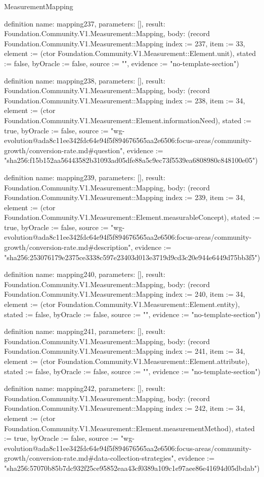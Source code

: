 \begin{lexlean}{MeasurementMapping}
\begin{semanticmodule}
definition{
  name: mapping237,
  parameters: [],
  result: Foundation.Community.V1.Measurement::Mapping,
  body: (record Foundation.Community.V1.Measurement::Mapping {index := 237, item := 33, element := (ctor Foundation.Community.V1.Measurement::Element.unit), stated := false, byOracle := false, source := "", evidence := "no-template-section"})
}

definition{
  name: mapping238,
  parameters: [],
  result: Foundation.Community.V1.Measurement::Mapping,
  body: (record Foundation.Community.V1.Measurement::Mapping {index := 238, item := 34, element := (ctor Foundation.Community.V1.Measurement::Element.informationNeed), stated := true, byOracle := false, source := "wg-evolution@ada8c11ee342fdc64e94f5f894676565aa2e6506:focus-areas/community-growth/conversion-rate.md#question", evidence := "sha256:f15b152aa56443582b31093ad05dfe88a5c9ec73f5539ea6808980c848100e05"})
}

definition{
  name: mapping239,
  parameters: [],
  result: Foundation.Community.V1.Measurement::Mapping,
  body: (record Foundation.Community.V1.Measurement::Mapping {index := 239, item := 34, element := (ctor Foundation.Community.V1.Measurement::Element.measurableConcept), stated := true, byOracle := false, source := "wg-evolution@ada8c11ee342fdc64e94f5f894676565aa2e6506:focus-areas/community-growth/conversion-rate.md#description", evidence := "sha256:253076179e2375ce3338c597e23403d013e3719d9cd3c20e944e6449d75bb3f5"})
}

definition{
  name: mapping240,
  parameters: [],
  result: Foundation.Community.V1.Measurement::Mapping,
  body: (record Foundation.Community.V1.Measurement::Mapping {index := 240, item := 34, element := (ctor Foundation.Community.V1.Measurement::Element.entity), stated := false, byOracle := false, source := "", evidence := "no-template-section"})
}

definition{
  name: mapping241,
  parameters: [],
  result: Foundation.Community.V1.Measurement::Mapping,
  body: (record Foundation.Community.V1.Measurement::Mapping {index := 241, item := 34, element := (ctor Foundation.Community.V1.Measurement::Element.attribute), stated := false, byOracle := false, source := "", evidence := "no-template-section"})
}

definition{
  name: mapping242,
  parameters: [],
  result: Foundation.Community.V1.Measurement::Mapping,
  body: (record Foundation.Community.V1.Measurement::Mapping {index := 242, item := 34, element := (ctor Foundation.Community.V1.Measurement::Element.measurementMethod), stated := true, byOracle := false, source := "wg-evolution@ada8c11ee342fdc64e94f5f894676565aa2e6506:focus-areas/community-growth/conversion-rate.md#data-collection-strategies", evidence := "sha256:57070b85b7dc932f25ce95852eaa43cf0389a109c1e97aee86e41694d05dbdab"})
}


\end{semanticmodule}
\end{lexlean}
